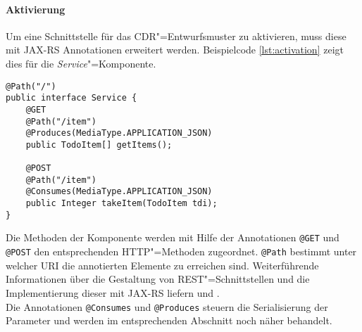 \paragraph{Aktivierung}
Um eine Schnittstelle für das \ac{CDR}"=Entwurfsmuster zu aktivieren, muss diese mit \ac{JAX-RS} Annotationen erweitert werden. 
Beispielcode \ref{lst:activation} zeigt dies für die \textit{Service}"=Komponente.
\begin{lstlisting}[caption={Aktivierung},captionpos=b,label=lst:activation] 
@Path("/")
public interface Service {	
	@GET
	@Path("/item")
	@Produces(MediaType.APPLICATION_JSON)
	public TodoItem[] getItems();	

	@POST
	@Path("/item")
	@Consumes(MediaType.APPLICATION_JSON)
	public Integer takeItem(TodoItem tdi);	
}
\end{lstlisting}
Die Methoden der Komponente werden mit Hilfe der Annotationen \colorbox{mygray}{\lstinline!@GET!} und \colorbox{mygray}{\lstinline!@POST!} den entsprechenden \ac{HTTP}"=Methoden zugeordnet. \colorbox{mygray}{\lstinline!@Path!} bestimmt unter welcher \ac{URI} die annotierten Elemente zu erreichen sind. Weiterführende Informationen über die Gestaltung von \ac{REST}"=Schnittstellen und die Implementierung dieser mit \ac{JAX-RS} liefern \cite{Tilkov2011} und \cite{Burke2010}. \\
Die Annotationen \colorbox{mygray}{\lstinline!@Consumes!} und \colorbox{mygray}{\lstinline!@Produces!} steuern die Serialisierung der Parameter und werden im entsprechenden Abschnitt noch näher behandelt.
\newpage
